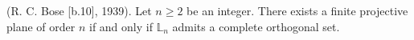 (R. C. Bose [b.10], 1939). Let $n \geq 2$ be an integer. There exists a finite projective plane of order $n$ if and only if $\mathbb{L}_n$ admits a complete orthogonal set.
